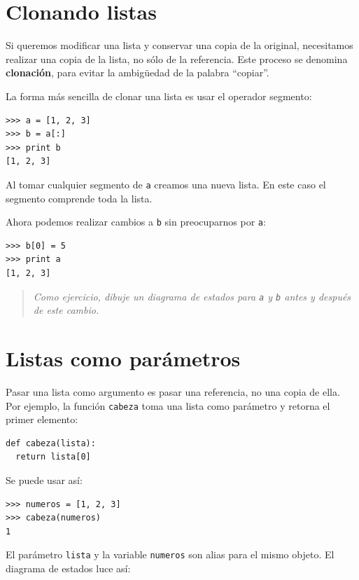 \section{Clonando listas}

Si queremos modificar una lista y conservar una copia de la original,
necesitamos realizar una copia de la lista, no sólo de la referencia.
Este proceso se denomina {\bf clonación}, para evitar la ambigüedad
de la palabra ``copiar''.

La forma más sencilla de clonar una lista es usar el operador segmento:

\beforeverb
\begin{verbatim}
>>> a = [1, 2, 3]
>>> b = a[:]
>>> print b
[1, 2, 3]
\end{verbatim}
\afterverb
%
Al tomar cualquier segmento de  \texttt{a} creamos una nueva lista.  En 
este caso el segmento comprende toda la lista.

Ahora podemos realizar cambios a \texttt{b} sin preocuparnos por \texttt{a}:

\beforeverb
\begin{verbatim}
>>> b[0] = 5
>>> print a
[1, 2, 3]
\end{verbatim}
\afterverb
%
\begin{quote}
{\em Como ejercicio, dibuje un diagrama de estados para \texttt{a} y \texttt{b}
antes y después de este cambio.}
\end{quote}



\section{Listas como parámetros}

Pasar una lista como argumento es pasar una referencia, no una copia
de ella. Por ejemplo, la función \texttt{cabeza} toma una lista como
 parámetro y retorna el primer elemento:

\beforeverb
\begin{verbatim}
def cabeza(lista):
  return lista[0]
\end{verbatim}
\afterverb
%
Se puede usar así:

\beforeverb
\begin{verbatim}
>>> numeros = [1, 2, 3]
>>> cabeza(numeros)
1
\end{verbatim}
\afterverb
%
El parámetro \texttt{lista} y la variable \texttt{numeros} son 
alias para el mismo objeto.  El diagrama de estados luce así:

